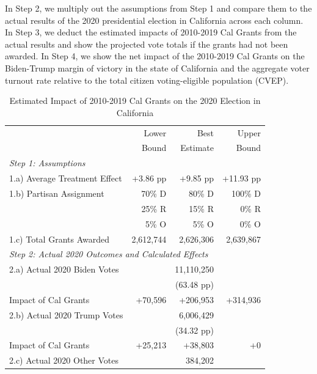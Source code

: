 \documentclass[12pt,letterpaper,oneside]{book}
\begin{document}
    In Step 2, we multiply out the assumptions from Step 1 and compare them to the actual results of the 2020 presidential election in California across each column. In Step 3, we deduct the estimated impacts of 2010-2019 Cal Grants from the actual results and show the projected vote totals if the grants had not been awarded. In Step 4, we show the net impact of the 2010-2019 Cal Grants on the Biden-Trump margin of victory in the state of California and the aggregate voter turnout rate relative to the total citizen voting-eligible population (CVEP).

    \clearpage


    \begin{table}[h!]\centering
        \centering
        \caption{Estimated Impact of 2010-2019 Cal Grants on the 2020 Election in California}
        \label{tab:envelope}
        \begin{tabular}{l*{3}{r}}
            \hline\hline
            & Lower & Best & Upper  \\
            & Bound &  Estimate &  Bound \\
            \hline
            \multicolumn{4}{l}{\textit{Step 1: Assumptions}} \\ [0.5em]
            1.a) Average Treatment Effect& +3.86 pp & +9.85 pp & +11.93 pp \\[0.5em]
            1.b) Partisan Assignment& 70\% D & 80\% D & 100\% D \\
            & 25\% R & 15\% R& 0\% R \\
            & 5\% O & 5\% O & 0\% O \\[0.5em]
            1.c) Total Grants Awarded& 2,612,744& 2,626,306& 2,639,867  \\[0.5em]
            \hline
            \multicolumn{4}{l}{\textit{Step 2: Actual 2020 Outcomes and Calculated Effects}} \\ [0.5em]
            2.a) Actual 2020 Biden Votes & & 11,110,250 & \\
            & &  (63.48 pp)& \\
            Impact of Cal Grants & +70,596 & +206,953 & +314,936 \\[0.5em]
            2.b) Actual 2020 Trump Votes&  & 6,006,429 &  \\
            & &  (34.32 pp)& \\
            Impact of Cal Grants & +25,213 & +38,803 & +0 \\[0.5em]
            2.c) Actual 2020 Other Votes&  & 384,202 &  \\

\end{tabular}
\end{table}
\end{document}
